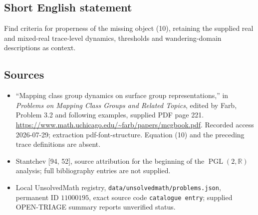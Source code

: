 \documentclass[11pt]{article}
\newcommand{\R}{\mathbb{R}}
\begin{document}
\subsection{Short English statement}
Find criteria for properness of the missing object (10), retaining the supplied real and mixed-real trace-level dynamics, thresholds and wandering-domain descriptions as context.
\subsection{Sources}
\begin{itemize}
\item ``Mapping class group dynamics on surface group representations,'' in \emph{Problems on Mapping Class Groups and Related Topics}, edited by Farb, Problem 3.2 and following examples, supplied PDF page 221. \url{https://www.math.uchicago.edu/~farb/papers/mcgbook.pdf}. Recorded access 2026-07-29; extraction pdf-font-structure. Equation (10) and the preceding trace definitions are absent.
\item Stantchev [94, 52], source attribution for the beginning of the \(\operatorname{PGL}(2,\R)\) analysis; full bibliography entries are not supplied.
\item Local UnsolvedMath registry, \texttt{data/unsolvedmath/problems.json}, permanent ID \(11000195\), exact source code \texttt{catalogue entry}; supplied OPEN-TRIAGE summary reports unverified status.
\end{itemize}
\end{document}
